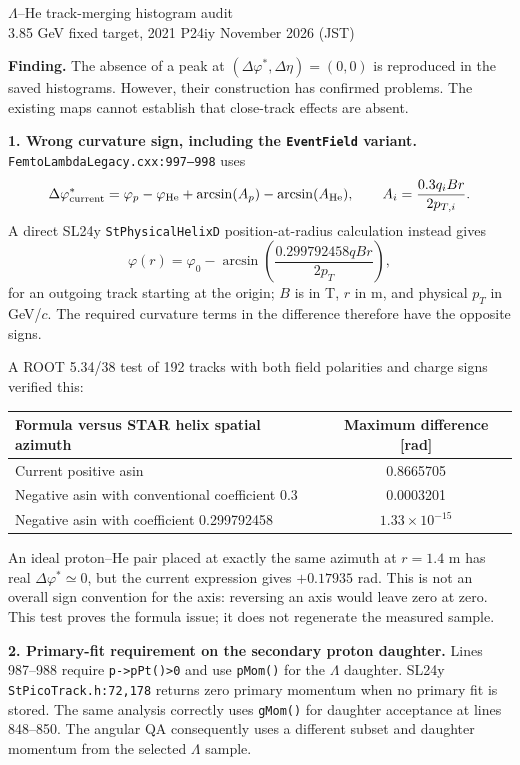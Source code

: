 \documentclass[10pt,a4paper]{article}
\begin{document}
\begin{center}{\Large $\Lambda$--He track-merging histogram audit}\\[4pt]
3.85 GeV fixed target, 2021 P24iy  November 2026 (JST)\end{center}
\textbf{Finding.} The absence of a peak at $(\Delta\varphi^*,\Delta\eta)=(0,0)$ is reproduced in the saved histograms.
However, their construction has confirmed problems. The existing maps cannot establish that close-track effects are absent.

\textbf{1. Wrong curvature sign, including the \texttt{EventField} variant.}
\texttt{FemtoLambdaLegacy.cxx:997--998} uses
\[\Delta\varphi^*_{\rm current}=\varphi_p-\varphi_{\rm He}
 +\arcsin(A_p)-\arcsin(A_{\rm He}),\qquad A_i=\frac{0.3q_iBr}{2p_{T,i}}.\]
A direct SL24y \texttt{StPhysicalHelixD} position-at-radius calculation instead gives
\[\varphi(r)=\varphi_0-\arcsin\!\left(\frac{0.299792458qBr}{2p_T}\right),\]
for an outgoing track starting at the origin; $B$ is in T, $r$ in m, and physical $p_T$ in GeV/$c$.
The required curvature terms in the difference therefore have the opposite signs.

A ROOT 5.34/38 test of 192 tracks with both field polarities and charge signs verified this:
\begin{center}\begin{tabular}{lc}\toprule
Formula versus STAR helix spatial azimuth & Maximum difference [rad]\\\midrule
Current positive asin & 0.8665705\\
Negative asin with conventional coefficient 0.3 & 0.0003201\\
Negative asin with coefficient 0.299792458 & $1.33\times10^{-15}$\\\bottomrule\end{tabular}\end{center}
An ideal proton--He pair placed at exactly the same azimuth at $r=1.4$ m has real
$\Delta\varphi^*\simeq0$, but the current expression gives $+0.17935$ rad.
This is not an overall sign convention for the axis: reversing an axis would leave zero at zero.
This test proves the formula issue; it does not regenerate the measured sample.

\textbf{2. Primary-fit requirement on the secondary proton daughter.}
Lines 987--988 require \texttt{p->pPt()>0} and use \texttt{pMom()} for the $\Lambda$ daughter.
SL24y \texttt{StPicoTrack.h:72,178} returns zero primary momentum when no primary fit is stored.
The same analysis correctly uses \texttt{gMom()} for daughter acceptance at lines 848--850.
The angular QA consequently uses a different subset and daughter momentum from the selected $\Lambda$ sample.
\end{document}
